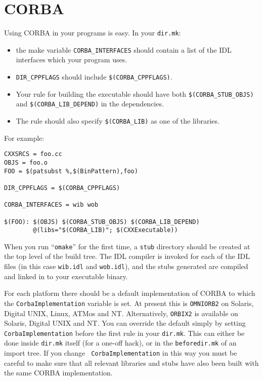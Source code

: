 \documentclass[11pt,twoside,onecolumn]{article}
\begin{document}
\section{CORBA}

Using CORBA in your programs is easy.  In your {\tt dir.mk}:
\begin{itemize}
\item the make variable \verb|CORBA_INTERFACES| should contain a list of the
IDL interfaces which your program uses.
\item \verb|DIR_CPPFLAGS| should include \verb|$(CORBA_CPPFLAGS)|.
\item Your rule for building the executable should have both
\verb|$(CORBA_STUB_OBJS)| and \verb|$(CORBA_LIB_DEPEND)| in the dependencies.
\item The rule should also specify \verb|$(CORBA_LIB)| as one of the libraries.
\end{itemize}
For example:

{\small \begin{verbatim}
CXXSRCS = foo.cc
OBJS = foo.o
FOO = $(patsubst %,$(BinPattern),foo)

DIR_CPPFLAGS = $(CORBA_CPPFLAGS)

CORBA_INTERFACES = wib wob

$(FOO): $(OBJS) $(CORBA_STUB_OBJS) $(CORBA_LIB_DEPEND)
        @(libs="$(CORBA_LIB)"; $(CXXExecutable))
\end{verbatim}}

When you run ``{\tt omake}'' for the first time, a {\tt stub} directory should
be created at the top level of the build tree.  The IDL compiler is invoked for
each of the IDL files (in this case {\tt wib.idl} and {\tt wob.idl}), and the
stubs generated are compiled and linked in to your executable binary.

For each platform there should be a default implementation of CORBA to which
the {\tt CorbaImplementation} variable is set. At present this is 
{\tt OMNIORB2} on Solaris, Digital UNIX, Linux, ATMos and
NT. Alternatively, {\tt ORBIX2} is available on Solaris, Digital UNIX and NT.
You can override the default simply by setting
{\tt CorbaImplementation} before the first rule in your {\tt dir.mk}.
This can either be done inside {\tt dir.mk} itself (for a one-off hack), or in
the {\tt beforedir.mk} of an import tree.  If you change {\tt
CorbaImplementation} in this way you must be careful to make sure that all
relevant libraries and stubs have also been built with the same CORBA
implementation.
\end{document}
